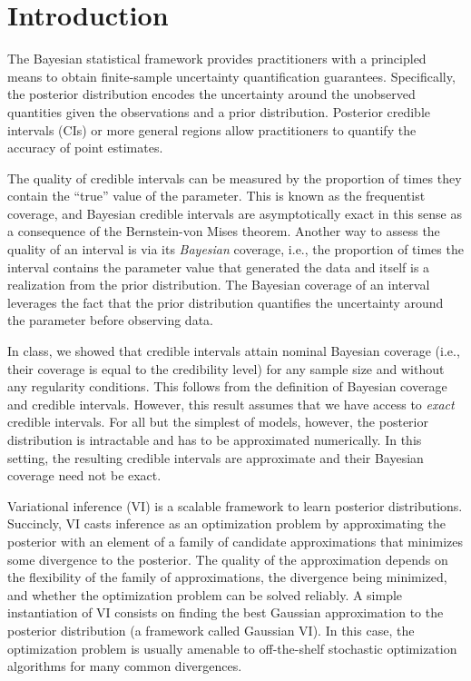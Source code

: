 \section{Introduction}

The Bayesian statistical framework provides practitioners with a principled
means to obtain finite-sample uncertainty quantification guarantees.
Specifically, the posterior distribution encodes the uncertainty
around the unobserved quantities given the observations and
a prior distribution.
Posterior credible intervals (CIs) or more general regions
allow practitioners to quantify the accuracy of point estimates.


The quality of credible intervals can be measured by
the proportion of times they contain the ``true''
value of the parameter.
This is known as the frequentist coverage,
and Bayesian credible intervals are asymptotically exact
in this sense as a consequence of the Bernstein-von Mises theorem.
Another way to assess the quality of an interval is via its
\emph{Bayesian} coverage, i.e.,
the proportion of times the interval contains the parameter
value that generated the data and itself is a realization from
the prior distribution.
The Bayesian coverage of an interval leverages the fact that the prior
distribution quantifies the uncertainty around the parameter
before observing data.

In class, we showed that credible intervals attain nominal Bayesian coverage
(i.e., their coverage is equal to the credibility level) for any sample size
and without any regularity conditions.
This follows from the definition of Bayesian coverage and credible intervals.
However, this result assumes that we have access to \emph{exact}
credible intervals.
For all but the simplest of models, however,
the posterior distribution is intractable and has to be approximated numerically.
In this setting,
the resulting credible intervals are approximate
and their Bayesian coverage need not be exact.

Variational inference (VI) is a scalable framework
to learn posterior distributions.
Succincly, VI casts inference as an optimization problem
by approximating the posterior with an element of
a family of candidate approximations that minimizes some divergence
to the posterior.
The quality of the approximation depends on
the flexibility of the family of approximations,
the divergence being minimized,
and whether the optimization problem can be solved reliably.
A simple instantiation of VI consists on finding the best
Gaussian approximation to the posterior distribution
(a framework called Gaussian VI).
In this case, the optimization problem is usually amenable
to off-the-shelf stochastic optimization algorithms
for many common divergences.

